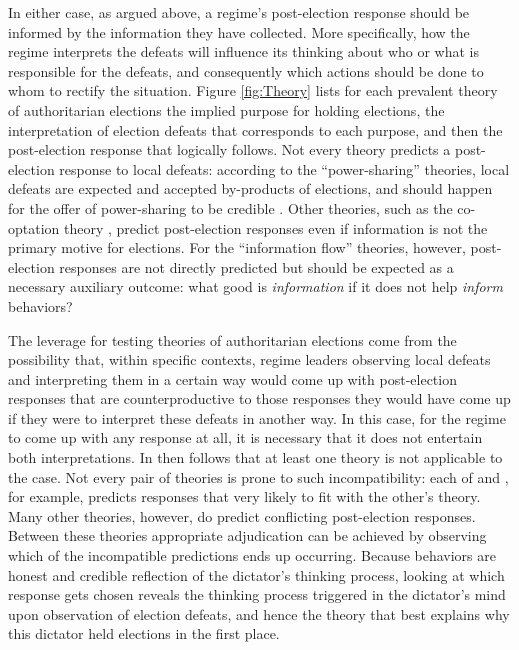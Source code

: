 \documentclass[12pt]{article}\usepackage[]{graphicx}\usepackage[]{color}
\newcommand{\1}{\mathbbm{1}}
\begin{document}
In either case, as argued above, a regime's post-election response should be informed by the information they have collected. More specifically, how the regime interprets the defeats will influence its thinking about who or what is responsible for the defeats, and consequently which actions should be done to whom to rectify the situation. Figure \ref{fig:Theory} lists for each prevalent theory of authoritarian elections the implied purpose for holding elections, the interpretation of election defeats that corresponds to each purpose, and then the post-election response that logically follows. Not every theory predicts a post-election response to local defeats: according to the ``power-sharing'' theories, local defeats are expected and accepted by-products of elections, and should happen for the offer of power-sharing to be credible \citep{AR2005, Cox2009}. Other theories, such as the co-optation theory \citep{LustOkar2005}, predict post-election responses even if information is not the primary motive for elections. For the ``information flow'' theories, however, post-election responses are not directly predicted but should be expected as a necessary auxiliary outcome: what good is \textit{information} if it does not help \textit{inform} behaviors?

The leverage for testing theories of authoritarian elections come from the possibility that, within specific contexts, regime leaders observing local defeats and interpreting them in a certain way would come up with post-election responses that are counterproductive to those responses they would have come up if they were to interpret these defeats in another way. In this case, for the regime to come up with any response at all, it is necessary that it does not entertain both interpretations. In then follows that at least one theory is not applicable to the case. Not every pair of theories is prone to such incompatibility: each of \cite{Miller2015} and \cite{Geddes2005}, for example, predicts responses that very likely to fit with the other's theory. Many other theories, however, do predict conflicting post-election responses. Between these theories appropriate adjudication can be achieved by observing which of the incompatible predictions ends up occurring. Because behaviors are honest and credible reflection of the dictator's thinking process, looking at which response gets chosen reveals the thinking process triggered in the dictator's mind upon observation of election defeats, and hence the theory that best explains why this dictator held elections in the first place.
\end{document}
